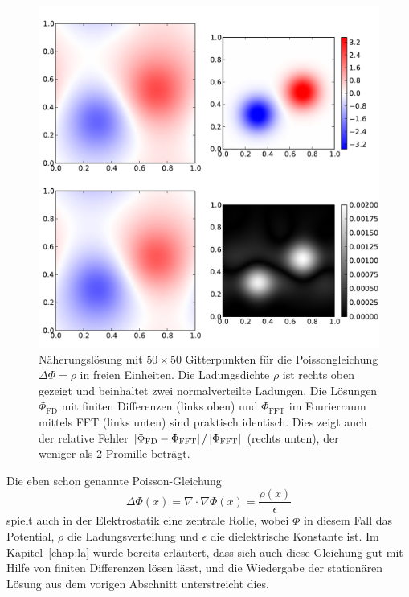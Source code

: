 \begin{figure}
  \centering
  \includegraphics[width=\textwidth]{plots/poisson}
  \caption{Näherungslösung mit $50\times 50$ Gitterpunkten für die
    Poissongleichung $\Delta \Phi=\rho$ in freien
    Einheiten. Die Ladungsdichte $\rho$ ist rechts oben gezeigt
    und beinhaltet zwei normalverteilte Ladungen. Die Lösungen
    $\Phi_\text{FD}$ mit finiten Differenzen (links oben) und
    $\Phi_\text{FFT}$ im Fourierraum mittels FFT (links unten) sind
    praktisch identisch. Dies zeigt auch der relative Fehler
    $\left\lvert{\Phi_\text{FD} - \Phi_\text{FFT}}\right\rvert/\left\lvert{\Phi_\text{FFT}}\right\rvert$
    (rechts unten), der weniger als 2 Promille beträgt.}
  \label{fig:poisson}
\end{figure}

Die eben schon genannte Poisson-Gleichung
\begin{equation}
  \label{eq:poissonreal}
  \Delta  \Phi(x) = \nabla \cdot \nabla \Phi(x)  = \frac{\rho(x)}{\epsilon}
\end{equation}
spielt auch in der Elektrostatik eine zentrale Rolle, wobei $\Phi$ in
diesem Fall das Potential, $\rho$ die Ladungsverteilung und $\epsilon$
die dielektrische Konstante ist. Im Kapitel~\ref{chap:la} wurde
bereits erläutert, dass sich auch diese Gleichung gut mit Hilfe von
finiten Differenzen lösen lässt, und die Wiedergabe der stationären
Lösung aus dem vorigen Abschnitt unterstreicht dies.


